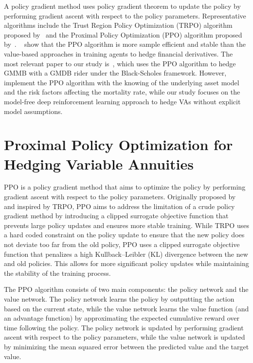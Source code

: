 \begin{enumerate}
    A policy gradient method uses policy gradient theorem to update the policy by performing gradient ascent with respect to the policy parameters.
    Representative algorithms include the Trust Region Policy Optimization (TRPO) algorithm proposed by~\cite{schulman2015trust} and the Proximal Policy Optimization (PPO) algorithm proposed by~\cite{schulman2017proximal}.
    ~\cite{du2020deep} show that the PPO algorithm is more sample efficient and stable than the value-based approaches in training agents to hedge financial derivatives.
    The most relevant paper to our study is~\cite{chong2023pseudo}, which uses the PPO algorithm to hedge GMMB with a GMDB rider under the Black-Scholes framework.
    However,~\cite{chong2023pseudo} implement the PPO algorithm with the knowing of the underlying asset model and the risk factors affecting the mortality rate, while our study focuses on the model-free deep reinforcement learning approach to hedge VAs without explicit model assumptions.

\end{enumerate}

\section{Proximal Policy Optimization for Hedging Variable Annuities}

PPO is a policy gradient method that aims to optimize the policy by performing gradient ascent with respect to the policy parameters.
Originally proposed by~\cite{schulman2017proximal} and inspired by TRPO, PPO aims to address the limitation of a crude policy gradient method by introducing a clipped surrogate objective function that prevents large policy updates and ensures more stable training.
While TRPO uses a hard coded constraint on the policy update to ensure that the new policy does not deviate too far from the old policy, PPO uses a clipped surrogate objective function that penalizes a high Kullback–Leibler (KL) divergence between the new and old policies. 
This allows for more significant policy updates while maintaining the stability of the training process.

The PPO algorithm consists of two main components: the policy network and the value network.
The policy network learns the policy by outputting the action based on the current state, while the value network learns the value function (and an advantage function) by approximating the expected cumulative reward over time following the policy.
The policy network is updated by performing gradient ascent with respect to the policy parameters, while the value network is updated by minimizing the mean squared error between the predicted value and the target value.

